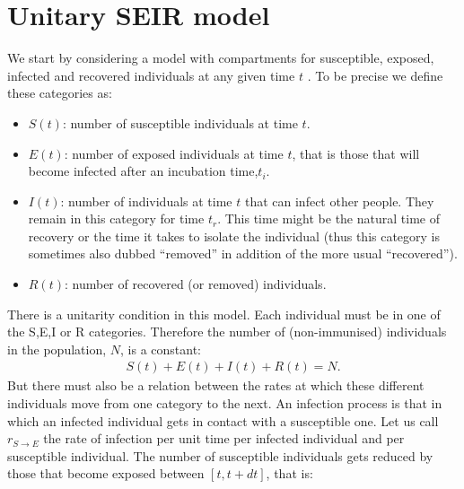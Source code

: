 \documentclass[a4paper,oneside,11pt]{article}
\begin{document}
\section{Unitary SEIR model}
\label{sec:useir}
We start by considering a model with compartments for susceptible, exposed, infected and recovered individuals at any given time $t$ \cite{}. To be precise we define these categories
as:
\begin{itemize}
\item $S(t)$: number of susceptible individuals at time $t$.
\item $E(t)$: number of exposed individuals at time $t$, that is those that will become infected after an incubation time,$t_i$. 
\item $I(t)$: number of individuals at time $t$ that can infect other people. They remain in this category for time $t_r$. This time might be the natural time of recovery or the time it takes to isolate the individual (thus this category is sometimes also dubbed ``removed'' in addition of the more usual ``recovered''). 
\item $R(t)$: number of recovered (or removed) individuals.
\end{itemize}
There is a unitarity condition in this model.  Each individual must be in one of the S,E,I or R categories. Therefore the number of (non-immunised) individuals in the population, $N$, is a constant:
\begin{eqnarray}
S(t)+ E(t)+I(t)+R(t) = N.
\end{eqnarray}
But there must also be a relation between the rates at which these different individuals move from one category to the next. An infection process is that in which an infected individual gets in contact with a susceptible one. Let us call $r_{S\rightarrow E}$ the rate of infection per unit time
per infected individual and per susceptible individual. The number of susceptible individuals gets reduced by those that become exposed between $[t, t+dt]$, that is:
\end{document}
